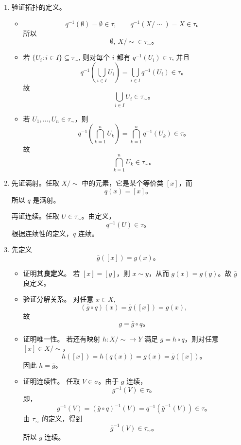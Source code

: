 \begin{solution}
	\begin{enumerate}[(1)]
		\item 验证拓扑的定义。
		  \begin{itemize}
				\item
					\[
						q^{-1}(\emptyset)=\emptyset\in \tau,
						\qquad
						q^{-1}(X/{\sim})=X\in \tau\text{。}
					\]
					所以
					\[
						\emptyset,\ X/{\sim}\in \tau_{\sim}\text{。}
					\]
				\item 若 $\{U_i: i \in I\} \subseteq \tau_{\sim}$,
				  则对每个 $i$ 都有 $q^{-1}(U_i) \in \tau$, 并且
					\[
						q^{-1}\!\left(\bigcup_{i\in I}U_i\right)
						=
						\bigcup_{i\in I}q^{-1}(U_i) \in \tau\text{。}
					\]
					故
					\[
						\bigcup_{i\in I}U_i\in \tau_{\sim}\text{。}
					\]
				\item 若 $U_1,\dots,U_n\in \tau_{\sim}$，则
					\[
						q^{-1}\!\left(\bigcap_{k=1}^{n}U_k\right)
						=
						\bigcap_{k=1}^{n}q^{-1}(U_k) \in \tau\text{。}
					\]
					故
					\[
						\bigcap_{k=1}^{n}U_k\in \tau_{\sim}\text{。}
					\]
			\end{itemize}
		\item 先证满射。任取 $X/{\sim}$ 中的元素，它是某个等价类 $[x]$，而
			\[
				q(x) = [x]\text{。}
			\]
			所以 $q$ 是满射。

			再证连续。任取 $U\in \tau_{\sim}$。由定义，
			\[
				q^{-1}(U)\in \tau\text{。}
			\]
			根据连续性的定义，$q$ 连续。
		\item 先定义
			\[
				\bar g([x])=g(x)\text{。}
			\]
			\begin{itemize}
				\item 证明其{\bf 良定义}。
				  若 $[x]=[y]$，则 $x\sim y$，从而 $g(x)=g(y)$。故 $\bar g$ 良定义。
				\item 验证分解关系。
				  对任意 $x\in X$,
					\[
						(\bar g\circ q)(x)=\bar g([x])=g(x),
					\]
					故
					\[
						g=\bar g\circ q\text{。}
					\]
				\item 证明唯一性。
				  若还有映射 $h:X/{\sim}\to Y$ 满足 $g=h\circ q$，则对任意 $[x]\in X/{\sim}$，
					\[
						h([x])=h(q(x))=g(x)=\bar g([x])\text{。}
					\]
					因此 $h = \bar g$。
				\item 证明连续性。
				  任取 $V\in \sigma$。由于 $g$ 连续，
					\[
						g^{-1}(V)\in \tau\text{。}
					\]
					即，
					\[
						g^{-1}(V)
						=
						(\bar g\circ q)^{-1}(V)
						=
						q^{-1}(\bar g^{-1}(V))
						\in \tau\text{。}
					\]
					由 $\tau_{\sim}$ 的定义，得到
					\[
						\bar g^{-1}(V)\in \tau_{\sim}\text{。}
					\]
					所以 $\bar g$ 连续。
			\end{itemize}
	\end{enumerate}
\end{solution}
